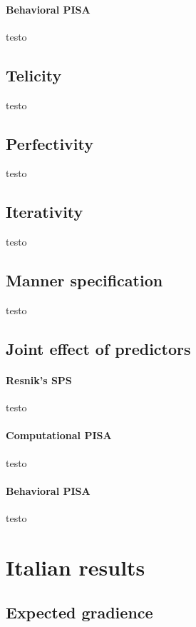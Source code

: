 \paragraph{Behavioral PISA} testo

\subsection{Telicity} 

testo

\subsection{Perfectivity} 

testo

\subsection{Iterativity}

testo

\subsection{Manner specification} 

testo

\subsection{Joint effect of predictors} 



\paragraph{Resnik's SPS} testo

\paragraph{Computational PISA} testo

\paragraph{Behavioral PISA} testo


\section{Italian results} 


\subsection{Expected gradience} 

